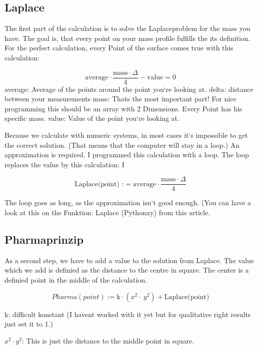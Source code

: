 \documentclass[pdftex,12pt,a4paper]{article}
\begin{document}
\subsection{Laplace}

The first part of the calculation is to solve the Laplaceproblem for the mass you have. The goal is, that every point on your mass profile fulfills the its definition. For the perfect calculation, every Point of the surface comes true with this calculation:


\[                                                            
	\text{average}\cdot\frac{\text{mass}\cdot\Delta}{4}- \text{value}= 0
\]
average: Average of the points around the point you`re looking at.
delta: distance between your measurements
mass: Thats the most important part! For nice programming this should be an array with 2 Dimensions. Every Point has his specific mass.
value: Value of the point you`re looking at.

Because we calculate with numeric systems, in most cases it`s impossible to get the correct solution. (That means that the computer will stay in a loop.) An approximation is required. I programmed this calculation with a loop. The loop replaces the value by this calculation: I

\[                                                            
	\text{Laplace(point) :}= \text{average}\cdot\frac{\text{mass}\cdot\Delta}{4}
\]

The loop goes as long, as the approximation isn`t good enough. (You can have a look at this on the Funktion: Laplace (Pythonxy) from this article.

\subsection{Pharmaprinzip}

As a second step, we have to add a value to the solution from Laplace.
The value which we add is definied as the distance to the centre in square. The center is a definied point in the middle of the calculation.

\[                                                            
	Pharma(point):= \text{k}\cdot\left(x^2\cdot\ y^2\right) + \text{Laplace(point)}
\]

k: difficult konstant (I havent worked with it yet but for qualitative right results just set it to 1.)

\(x^2 \cdot y^2 \): This is just the distance to the middle point in square.
\end{document}
